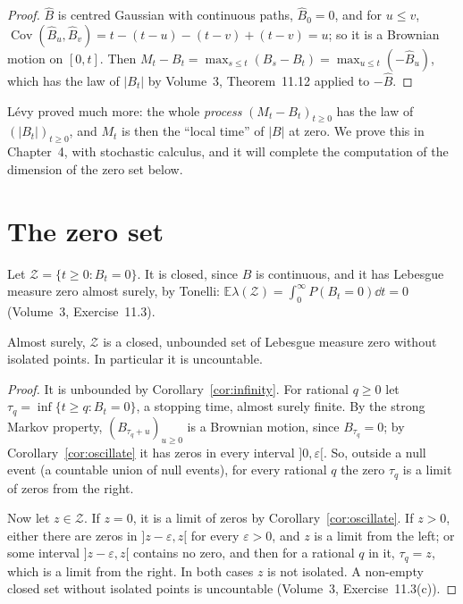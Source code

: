 \begin{proof}
$\hat B$ is centred Gaussian with continuous paths, $\hat B_0=0$, and for $u\le v$, $\operatorname{Cov}(\hat B_u,\hat B_v)=t-(t-u)-(t-v)+(t-v)=u$; so it is a Brownian motion on $[0,t]$. Then
$M_t-B_t=\max_{s\le t}(B_s-B_t)=\max_{u\le t}(-\hat B_u)$, which has the law of $|B_t|$ by Volume~3, Theorem~11.12 applied to $-\hat B$.
\end{proof}

L\'evy proved much more: the whole \emph{process} $(M_t-B_t)_{t\ge0}$ has the law of $(|B_t|)_{t\ge0}$, and $M_t$ is then the ``local time'' of $|B|$ at zero. We prove this in Chapter~4, with
stochastic calculus, and it will complete the computation of the dimension of the zero set below.

\section{The zero set}

Let $\mathcal Z=\{t\ge0:B_t=0\}$. It is closed, since $B$ is continuous, and it has Lebesgue measure zero almost surely, by Tonelli: $\mathbb E\lambda(\mathcal Z)=\int_0^\infty P(B_t=0)\dd t=0$ (Volume~3, Exercise~11.3).

\begin{theorem}\label{thm:zeroset}
Almost surely, $\mathcal Z$ is a closed, unbounded set of Lebesgue measure zero without isolated points. In particular it is uncountable.
\end{theorem}

\begin{proof}
It is unbounded by Corollary~\ref{cor:infinity}. For rational $q\ge0$ let $\tau_q=\inf\{t\ge q:B_t=0\}$, a stopping time, almost surely finite. By the strong Markov property, $(B_{\tau_q+u})_{u\ge0}$ is a
Brownian motion, since $B_{\tau_q}=0$; by Corollary~\ref{cor:oscillate} it has zeros in every interval $]0,\varepsilon[$. So, outside a null event (a countable union of null events), for every rational $q$ the
zero $\tau_q$ is a limit of zeros from the right.

Now let $z\in\mathcal Z$. If $z=0$, it is a limit of zeros by Corollary~\ref{cor:oscillate}. If $z>0$, either there are zeros in $]z-\varepsilon,z[$ for every $\varepsilon>0$, and $z$ is a limit from the left; or some
interval $]z-\varepsilon,z[$ contains no zero, and then for a rational $q$ in it, $\tau_q=z$, which is a limit from the right. In both cases $z$ is not isolated. A non-empty closed set without isolated points is
uncountable (Volume~3, Exercise~11.3(c)).
\end{proof}

